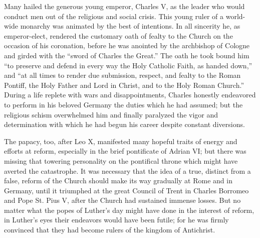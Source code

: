 Many hailed the generous young emperor, Charles V, as the leader
who would conduct men out of the religious and social crisis. This
young ruler of a world-wide monarchy was animated by the best
of intentions. In all sincerity he, as emperor-elect, rendered the customary
oath of fealty to the Church on the occasion of his coronation, before
he was anointed by the archbishop of Cologne and girded
with the “sword of Charles the Great.” The oath he took bound
him “to preserve and defend in every way the Holy Catholic Faith,
as handed down,” and “at all times to render due submission, respect,
and fealty to the Roman Pontiff, the Holy Father and Lord in Christ,
and to the Holy Roman Church.” During a life replete with wars
and disappointments, Charles honestly endeavored to perform in
his beloved Germany the duties which he had assumed; but the religious
schism overwhelmed him and finally paralyzed the vigor and
determination with which he had begun his career despite constant
diversions.

The papacy, too, after Leo X, manifested many hopeful traits of
energy and efforts at reform, especially in the brief pontificate of
Adrian VI; but there was missing that towering personality on the
pontifical throne which might have averted the catastrophe. It was
necessary that the idea of a true, distinct from a false, reform of the
Church should make its way gradually at Rome and in Germany,
until it triumphed at the great Council of Trent in Charles Borromeo
and Pope St. Pius V, after the Church had sustained immense losses.
But no matter what the popes of Luther’s day might have done in
the interest of reform, in Luther’s eyes their endeavors would have
been futile; for he was firmly convinced that they had become
rulers of the kingdom of Antichrist.
